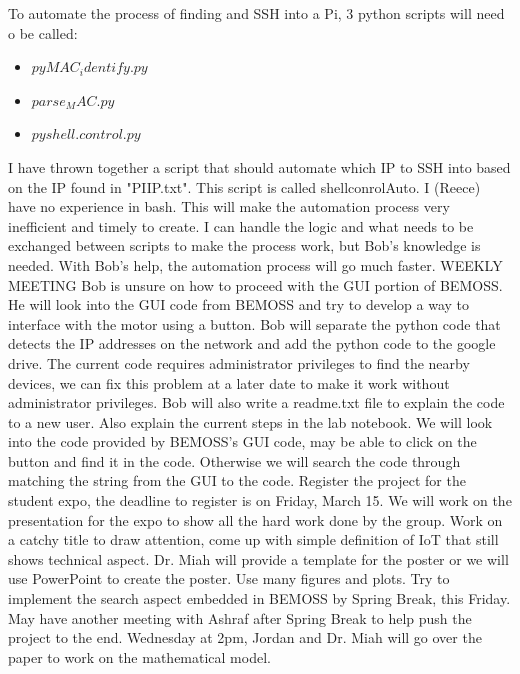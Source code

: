 \documentclass[fontsize=11pt, %
                             paper=letter, %
                             twoside, %
                             captions=tableheading,
                             index=totoc,
                             hyperref]{labbook}
\begin{document}
To automate the process of finding and SSH into a Pi, 3 python scripts will need o be called: 
\begin{itemize}
    \item $pyMAC_identify.py$
    \item $parse_MAC.py$
    \item $pyshell.control.py$
\end{itemize}
I have thrown together a script that should automate which IP to SSH into based on the IP found in "PIIP.txt". This script is called shellconrolAuto. 
I (Reece) have no experience in bash. This will make the automation process very inefficient and timely to create. I can handle the logic and what needs to be exchanged between scripts to make the process work, but Bob's knowledge is needed. With Bob's help, the automation process will go much faster. 
\newline
WEEKLY MEETING
\newline
Bob is unsure on how to proceed with the GUI portion of BEMOSS. He will look into the GUI code from BEMOSS and try to develop a way to interface with the motor using a button. Bob will separate the python code that detects the IP addresses on the network and add the python code to the google drive. The current code requires administrator privileges to find the nearby devices, we can fix this problem at a later date to make it work without administrator privileges. Bob will also write a readme.txt file to explain the code to a new user. Also explain the current steps in the lab notebook. We will look into the code provided by BEMOSS's GUI code, may be able to click on the button and find it in the code. Otherwise we will search the code through matching the string from the GUI to the code.
\newline
Register the project for the student expo, the deadline to register is on Friday, March 15. We will work on the presentation for the expo to show all the hard work done by the group. Work on a catchy title to draw attention, come up with simple definition of IoT that still shows technical aspect. Dr. Miah will provide a template for the poster or we will use PowerPoint to create the poster. Use many figures and plots.
\newline
Try to implement the search aspect embedded in BEMOSS by Spring Break, this Friday. May have another meeting with Ashraf after Spring Break to help push the project to the end.
\newline
Wednesday at 2pm, Jordan and Dr. Miah will go over the paper to work on the mathematical model.
\end{document}
